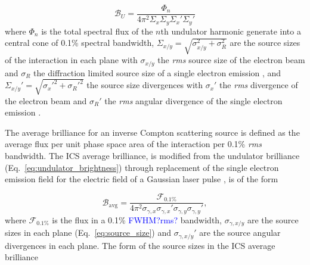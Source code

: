 \documentclass[../main.tex]{subfiles}
\begin{document}
\begin{equation}
\mathcal{B}_{U} = \frac{\Phi_{n}}{4\pi^{2}\Sigma_{x}\Sigma_{y}\Sigma_{x}'\Sigma_{y}'}
\label{eq:undulator_brightness}    
\end{equation}
where $\Phi_{n}$ is the total spectral flux of the $n$th undulator harmonic generate into a central cone of 0.1\% spectral bandwidth, $\Sigma_{x/y} = \sqrt{\sigma_{x/y}^{2}+\sigma_{R}^{2}}$ are the source sizes of the interaction in each plane with $\sigma_{x/y}$ the \textit{rms} source size of the electron beam and $\sigma_{R}$ the diffraction limited source size of a single electron emission \cite{kim1987brightness}, and $\Sigma_{x/y}' = \sqrt{\sigma_{x}'^{2}+\sigma_{R}'^{2}}$ the source size divergences with $\sigma_{x}'$ the \textit{rms} divergence of the electron beam and $\sigma_{R}'$ the \textit{rms} angular divergence of the single electron emission \cite{krinsky1983undulators}. 

The average brilliance for an inverse Compton scattering source is defined as the average flux per unit phase space area of the interaction per 0.1\% \textit{rms} bandwidth. The ICS average brilliance, is modified from the undulator brilliance (Eq.~\ref{eq:undulator_brightness}) through replacement of the single electron emission field for the electric field of a Gaussian laser pulse \cite{krafft2010compton,deitrick2018high}, is of the form   

\begin{equation}
\mathcal{B}_{\mathrm{avg}} = \frac{\mathcal{F}_{0.1\%}}{4\pi^{2}\sigma_{\gamma,x}\sigma_{\gamma,x}'\sigma_{\gamma,y}\sigma_{\gamma,y}'},
\label{eq:average_brightness}
\end{equation}
where $\mathcal{F}_{0.1\%}$ is the flux in a 0.1\%  \textcolor{blue}{FWHM?rms?} bandwidth, $\sigma_{\gamma,x/y}$ are the source sizes in each plane (Eq.~\ref{eq:source_size}) and $\sigma_{\gamma,x/y}'$ are the source angular divergences in each plane. The form of the source sizes in the ICS average brilliance 
\end{document}
